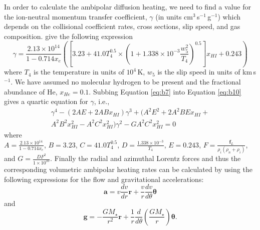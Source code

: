 In order to calculate the ambipolar diffusion heating, we need to find a value for the ion-neutral momentum transfer coefficient, $\gamma$ (in units cm$^3$\,s$^{-1}$\,g$^{-1}$) which depends on the collisional coefficient rates, cross sections, slip speed, and gas composition. \cite{shang_2002} give the following expression
\begin{equation}\label{eq:b10}
\gamma =\frac{2.13\times 10^{14}}{1-0.714x_{e}}\left( \left[ 3.23 +41.0T_{4}^{0.5}\times \left(1+1.338\times 10^{-3}\frac{w_{5}^{2}}{T_{4}} \right)^{0.5}\right]x_{HI}+0.243\right)
\end{equation} 
where $T_{4}$ is the temperature in units of $10^4$\,K, $w_{5}$ is the slip speed in units of km\,s$^{-1}$. We have assumed no molecular hydrogen to be present and the fractional abundance of He, $x_{He}=0.1$.  Subbing Equation \ref{eq:b7} into Equation \ref{eq:b10} gives a quartic equation for $\gamma$, i.e., 
\begin{eqnarray*}
\gamma^{4}-(2AE + 2ABx_{HI})\gamma^{3} + (A^{2}E^{2} + 2A^{2}BEx_{HI} + \\ A^{2}B^{2}x_{HI}^{2}-A^{2}C^{2}x_{HI}^{2})\gamma^{2} - GA^{2}C^{2}x_{HI}^{2} = 0
\end{eqnarray*} 
where\\
$A=\frac{2.13\times 10^{14}}{1-0.714x_{e}}$, $B=3.23$, $C=41.0T^{0.5}_{4}$, $D=\frac{1.338\times 10^{-3}}{T_{4}}$, $E=0.243$, $F=\frac{\pmb{f} _{L}}{\rho_{i}(\rho_{n}+\rho_{i})}$, and $G=\frac{DF^{2}}{1\times10^{10}}$. Finally the radial and azimuthal Lorentz forces and thus the corresponding volumetric ambipolar heating rates can be calculated by using the following expressions for the flow and gravitational accelerations:
\begin{equation}
\pmb{a} = v\frac{dv}{dr}\pmb{r} + \frac{v}{r}\frac{dv}{d\theta}\pmb{\theta}
\end{equation}
and
\begin{equation}
\pmb{g} = -\frac{GM_{\star}}{r^2}\pmb{r} + \frac{1}{r}\frac{d}{d\theta}\left(\frac{GM_{\star}}{r} \right)\pmb{\theta}.
\end{equation}
